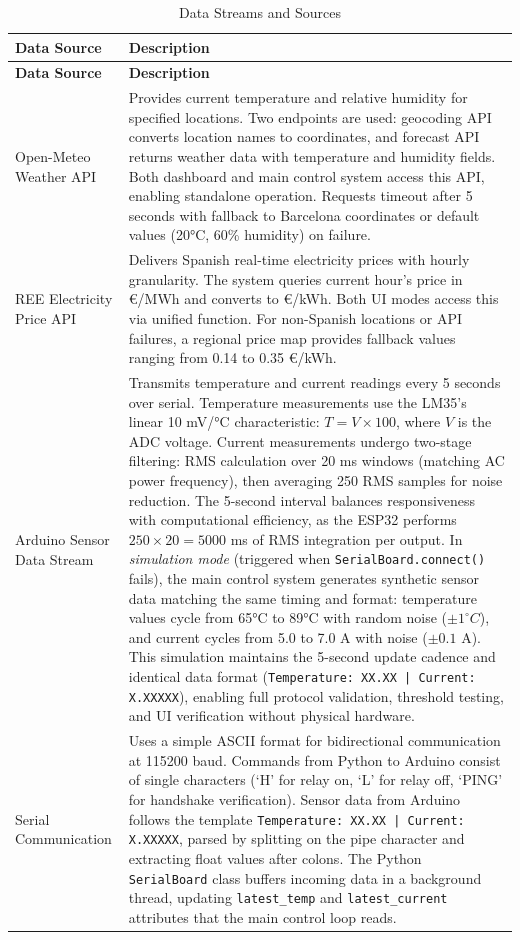 \documentclass[11pt,a4paper]{article}
\begin{document}
\begin{longtable}{|p{}|p{}|}
\caption{Data Streams and Sources}
\label{tab:data_streams} \\
\hline
\textbf{Data Source} & \textbf{Description} \\
\hline
\endfirsthead
\hline
\textbf{Data Source} & \textbf{Description} \\
\hline
\endhead
\hline
\endfoot
\hline
\endlastfoot
Open-Meteo Weather API & Provides current temperature and relative humidity for specified locations. Two endpoints are used: geocoding API converts location names to coordinates, and forecast API returns weather data with temperature and humidity fields. Both dashboard and main control system access this API, enabling standalone operation. Requests timeout after 5 seconds with fallback to Barcelona coordinates or default values (20°C, 60\% humidity) on failure. \\
\hline
REE Electricity Price API & Delivers Spanish real-time electricity prices with hourly granularity. The system queries current hour's price in €/MWh and converts to €/kWh. Both UI modes access this via unified function. For non-Spanish locations or API failures, a regional price map provides fallback values ranging from 0.14 to 0.35 €/kWh. \\
\hline
Arduino Sensor Data Stream & Transmits temperature and current readings every 5 seconds over serial. Temperature measurements use the LM35's linear 10 mV/°C characteristic: $T = V \times 100$, where $V$ is the ADC voltage. Current measurements undergo two-stage filtering: RMS calculation over 20 ms windows (matching AC power frequency), then averaging 250 RMS samples for noise reduction. The 5-second interval balances responsiveness with computational efficiency, as the ESP32 performs $250 \times 20 = 5000$ ms of RMS integration per output. In \emph{simulation mode} (triggered when \texttt{SerialBoard.connect()} fails), the main control system generates synthetic sensor data matching the same timing and format: temperature values cycle from 65°C to 89°C with random noise ($\pm 1^\circ C$), and current cycles from 5.0 to 7.0 A with noise ($\pm 0.1$ A). This simulation maintains the 5-second update cadence and identical data format (\texttt{Temperature: XX.XX | Current: X.XXXXX}), enabling full protocol validation, threshold testing, and UI verification without physical hardware. \\
\hline
Serial Communication & Uses a simple ASCII format for bidirectional communication at 115200 baud. Commands from Python to Arduino consist of single characters (`H' for relay on, `L' for relay off, `PING' for handshake verification). Sensor data from Arduino follows the template \texttt{Temperature: XX.XX | Current: X.XXXXX}, parsed by splitting on the pipe character and extracting float values after colons. The Python \texttt{SerialBoard} class buffers incoming data in a background thread, updating \texttt{latest\_temp} and \texttt{latest\_current} attributes that the main control loop reads. \\
\hline
\end{longtable}
\end{document}
